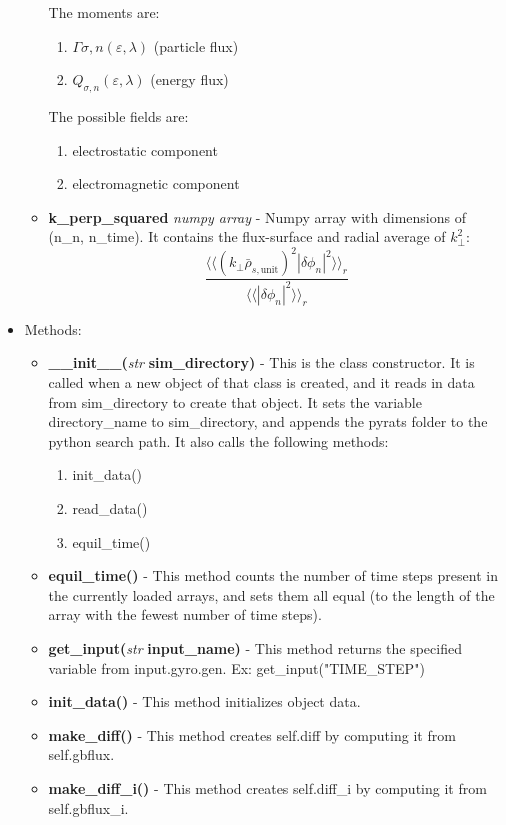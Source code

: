 \documentclass{article}
\begin{document}
\begin{itemize}
\begin{itemize}
The moments are:
\begin{enumerate}
\item $\Gamma{\sigma,n}(\varepsilon,\lambda)$ (particle flux)
\item $Q_{\sigma,n}(\varepsilon,\lambda)$ (energy flux)
\end{enumerate}
The possible fields are:
\begin{enumerate}
\item electrostatic component
\item electromagnetic component
\end{enumerate}
\item \textbf{k\_perp\_squared}\emph{ numpy array} - Numpy array with dimensions of (n\_n, n\_time).  It contains the flux-surface and radial average of $k^2_\perp$:
$$\frac{\langle\langle(k_\perp\bar{\rho}_{s,\mathrm{unit}})^2|\delta\phi_n|^2\rangle\rangle_r}{\langle\langle|\delta\phi_n|^2\rangle\rangle_r}$$
\end{itemize}
\item Methods:
\begin{itemize}
\item \textbf{\_\_init\_\_(}\emph{str}\textbf{ sim\_directory)} - This is the class constructor.  It is called when a new object of that class is created, and it reads in data from sim\_directory to create that object.  It sets the variable directory\_name to sim\_directory, and appends the pyrats folder to the python search path.  It also calls the following methods:
\begin{enumerate}
\item init\_data()
\item read\_data()
\item equil\_time()
\end{enumerate}
\item \textbf{equil\_time()} - This method counts the number of time steps present in the currently loaded arrays, and sets them all equal (to the length of the array with the fewest number of time steps).
\item \textbf{get\_input(}\emph{str}\textbf{ input\_name)} - This method returns the specified variable from input.gyro.gen.  Ex: get\_input("TIME\_STEP")
\item \textbf{init\_data()} - This method initializes object data.
\item \textbf{make\_diff()} - This method creates self.diff by computing it from self.gbflux.
\item \textbf{make\_diff\_i()} - This method creates self.diff\_i by computing it from self.gbflux\_i.

\end{itemize}
\end{itemize}
\end{document}
